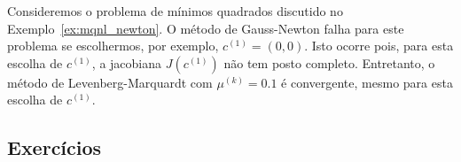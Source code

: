 \begin{ex}\label{ex:mqnl_LM}
  Consideremos o problema de mínimos quadrados discutido no Exemplo~\ref{ex:mqnl_newton}. O método de Gauss-Newton falha para este problema se escolhermos, por exemplo, $c^{(1)} = (0, 0)$. Isto ocorre pois, para esta escolha de $c^{(1)}$, a jacobiana $J(c^{(1)})$ não tem posto completo. Entretanto, o método de Levenberg-Marquardt com $\mu^{(k)} = 0.1$ é convergente, mesmo para esta escolha de $c^{(1)}$.







\end{ex}

\subsection{Exercícios}
\badgeRevisar

